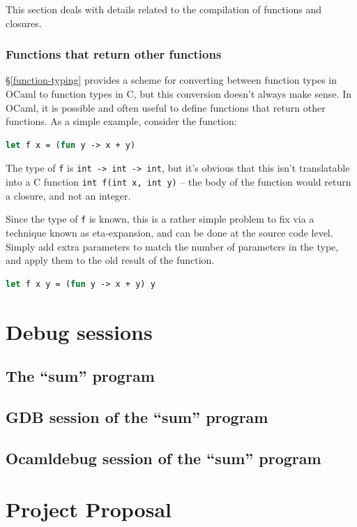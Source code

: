 \documentclass[12pt,a4paper,twoside,openright]{report}
\begin{document}
This section deals with details related to the compilation of functions and
closures.

\subsection{Functions that return other functions} \label{incomplete-funcs}

\S\ref{function-typing} provides a scheme for converting between function types
in OCaml to function types in C, but this conversion doesn't always make sense.
In OCaml, it is possible and often useful to define functions that return other
functions. As a simple example, consider the function:

\begin{lstlisting}[language=Caml]
let f x = (fun y -> x + y)
\end{lstlisting}

The type of \texttt{f} is \texttt{int -> int -> int}, but it's obvious that this
isn't translatable into a C function \texttt{int f(int x, int y)} -- the body of
the function would return a closure, and not an integer.

Since the type of \texttt{f} is known, this is a rather simple problem to fix
via a technique known as eta-expansion, and can be done at the source code
level. Simply add extra parameters to match the number of parameters in the
type, and apply them to the old result of the function.

\begin{lstlisting}[language=Caml]
let f x y = (fun y -> x + y) y
\end{lstlisting}


\chapter{Debug sessions} \label{debug-sessions}

\section{The ``sum'' program}



\section{GDB session of the ``sum'' program} \label{debug-gdb}



\section{Ocamldebug session of the ``sum'' program} \label{debug-ocaml}



\chapter{Project Proposal}


\end{document}
